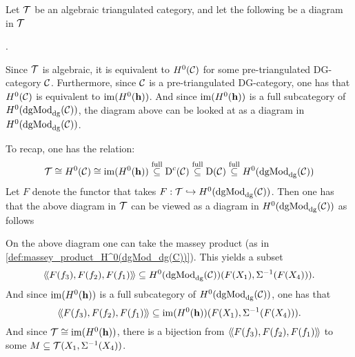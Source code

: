\begin{remark}
    \label{rem:massey_in_alg_tri_cat}
    Let \( {\mathcal{T}} \) be an algebraic triangulated category, and let the following be a diagram in \( {\mathcal{T}} \)
    \begin{center}
        .
    \end{center}

    Since \( {\mathcal{T}} \) is algebraic, it is equivalent to \( H^0({\mathcal{C}}) \) for some pre-triangulated DG-category \( {\mathcal{C}} \). Furthermore, since \( {\mathcal{C}} \) is a pre-triangulated DG-category, one has that \( H^0({\mathcal{C}}) \) is equivalent to \( \operatorname{im}(H^0(\mathbf{h})) \). And since \( \operatorname{im}(H^0(\mathbf{h})) \) is a full subcategory of \( H^0(\operatorname{dgMod}_{\operatorname{dg}}({\mathcal{C}})) \), the diagram above can be looked at as a diagram in \( H^0(\operatorname{dgMod}_{\operatorname{dg}}({\mathcal{C}})) \).

    To recap, one has the relation:
    \[
        {\mathcal{T}} \cong H^0({\mathcal{C}}) \cong \operatorname{im}(H^0(\mathbf{h})) \stackrel{\text{full}}{\subseteq} \operatorname{D}^c({\mathcal{C}}) \stackrel{\text{full}}{\subseteq} \operatorname{D}({\mathcal{C}}) \stackrel{\text{full}}{\subseteq} H^0(\operatorname{dgMod}_{\operatorname{dg}}({\mathcal{C}}))
    \]
    Let \( F \) denote the functor that takes \( F: {\mathcal{T}} \hookrightarrow H^0(\operatorname{dgMod}_{\operatorname{dg}}({\mathcal{C}})) \). Then one has that the above diagram in \( {\mathcal{T}} \) can be viewed as a diagram in \( H^0(\operatorname{dgMod}_{\operatorname{dg}}({\mathcal{C}})) \) as follows
    \begin{center}
    \end{center}
    
    On the above diagram one can take the massey product (as in \autoref{def:massey_product_H^0(dgMod_dg(C))}). This yields a subset
    \[
        \langle \! \langle F(f_3), F(f_2), F(f_1)\rangle \! \rangle \subseteq H^0(\operatorname{dgMod}_{\operatorname{dg}}({\mathcal{C}}))(F(X_1), \Sigma^{-1}(F(X_4))).
    \]
    And since \( \operatorname{im}(H^0(\mathbf{h})) \) is a full subcategory of \( H^0(\operatorname{dgMod}_{\operatorname{dg}}({\mathcal{C}})) \), one has that
    \[
        \langle \! \langle F(f_3), F(f_2), F(f_1)\rangle \! \rangle \subseteq \operatorname{im}(H^0(\mathbf{h}))(F(X_1), \Sigma^{-1}(F(X_4))).
    \]
    And since \( {\mathcal{T}} \cong \operatorname{im}(H^0(\mathbf{h})) \), there is a bijection from \( \langle \! \langle F(f_3), F(f_2), F(f_1)\rangle \! \rangle \) to some \( M \subseteq {\mathcal{T}}(X_1, \Sigma^{-1}(X_4)) \).


\end{remark}
